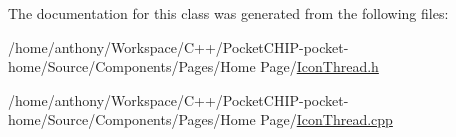 The documentation for this class was generated from the following files\+:\begin{DoxyCompactItemize}
\item 
/home/anthony/\+Workspace/\+C++/\+Pocket\+C\+H\+I\+P-\/pocket-\/home/\+Source/\+Components/\+Pages/\+Home Page/\mbox{\hyperlink{IconThread_8h}{Icon\+Thread.\+h}}\item 
/home/anthony/\+Workspace/\+C++/\+Pocket\+C\+H\+I\+P-\/pocket-\/home/\+Source/\+Components/\+Pages/\+Home Page/\mbox{\hyperlink{IconThread_8cpp}{Icon\+Thread.\+cpp}}\end{DoxyCompactItemize}
